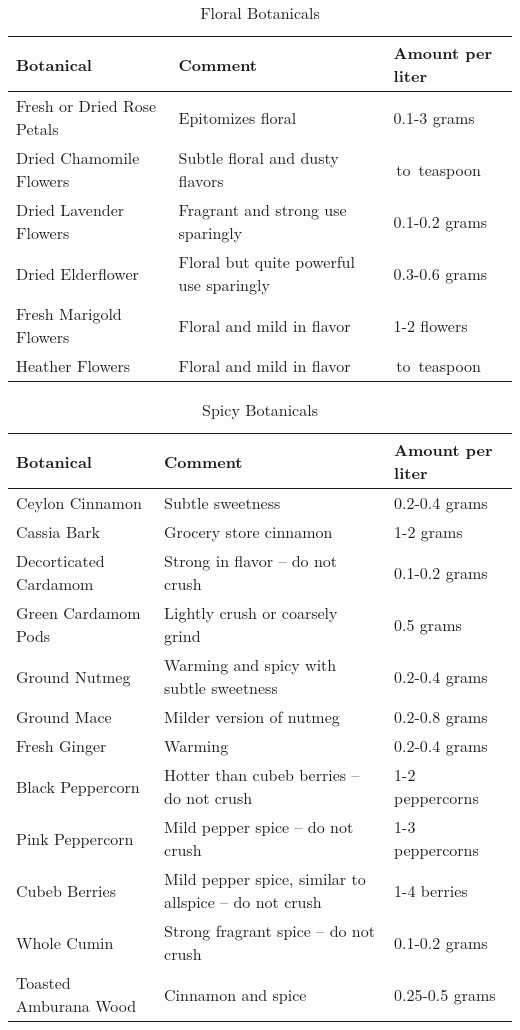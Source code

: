 \documentclass[letterpaper]{recipePMG}
\newcommand{\quarter}{\nicefrac{1}{4} \,}
\newcommand{\half}{\nicefrac{1}{2} \,}
\begin{document}
\begin{table}[H]
    \centering
    \caption{Floral Botanicals}
    \begin{tabular}{@{}p{1.25in}p{3in}p{1.25in}@{}}
        \toprule
      Botanical &  Comment & Amount per liter \\
        \midrule
		Fresh or Dried Rose Petals & Epitomizes floral & 0.1-3 grams \\
		Dried Chamomile Flowers & Subtle floral and dusty flavors & \quarter to \half teaspoon \\
		Dried Lavender Flowers & Fragrant and strong use sparingly & 0.1-0.2 grams \\
		Dried Elderflower & Floral but quite powerful use sparingly & 0.3-0.6 grams \\
		Fresh Marigold Flowers & Floral and mild in flavor & 1-2 flowers \\
		Heather Flowers & Floral and mild in flavor & \quarter to \half teaspoon \\
\end{tabular}
    \label{tab:floral}
\end{table}

\begin{table}[H]
    \centering
    \caption{Spicy Botanicals}
    \begin{tabular}{@{}p{1.25in}p{3in}p{1.25in}@{}}
        \toprule
      Botanical &  Comment & Amount per liter \\
        \midrule
		Ceylon Cinnamon & Subtle sweetness & 0.2-0.4 grams \\
		Cassia Bark & Grocery store cinnamon & 1-2 grams \\
		Decorticated Cardamom & Strong in flavor -- do not crush & 0.1-0.2 grams \\
		Green Cardamom Pods & Lightly crush or coarsely grind & 0.5 grams \\
		Ground Nutmeg & Warming and spicy with subtle sweetness & 0.2-0.4 grams \\
		Ground Mace & Milder version of nutmeg & 0.2-0.8 grams \\
		Fresh Ginger & Warming & 0.2-0.4 grams \\
		Black Peppercorn & Hotter than cubeb berries -- do not crush & 1-2 peppercorns \\
		Pink Peppercorn & Mild pepper spice -- do not crush & 1-3 peppercorns \\
		Cubeb Berries & Mild pepper spice, similar to allspice -- do not crush & 1-4 berries \\
		Whole Cumin & Strong fragrant spice -- do not crush & 0.1-0.2 grams \\
        Toasted Amburana Wood & Cinnamon and spice & 0.25-0.5 grams \\
\end{tabular}
    \label{tab:spicy}
\end{table}
\end{document}
